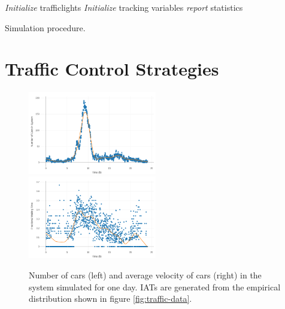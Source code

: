 \documentclass[10pt]{article}
\begin{document}
\DontPrintSemicolon
{}
\begin{algorithm}[h]
	\;
	\;
	\textit{Initialize} trafficlights\;
	\textit{Initialize} tracking variables\;
	\; 
	\;
	\textit{report} statistics\;	
	
	\caption{Simulation procedure. \label{alg:simulation}}

\end{algorithm}

\section{Traffic Control Strategies}

\begin{figure}[htb]
	\includegraphics[width=0.5\textwidth]{img/number_of_cars_over_day.png}
	\includegraphics[width=0.5\textwidth]{img/velocity_over_day.png}
	\caption{Number of cars (left) and average velocity of cars (right) in the system simulated for one day. IATs are generated from the empirical distribution shown in figure \ref{fig:traffic-data}. \label{fig:validation}}
\end{figure}
\end{document}
